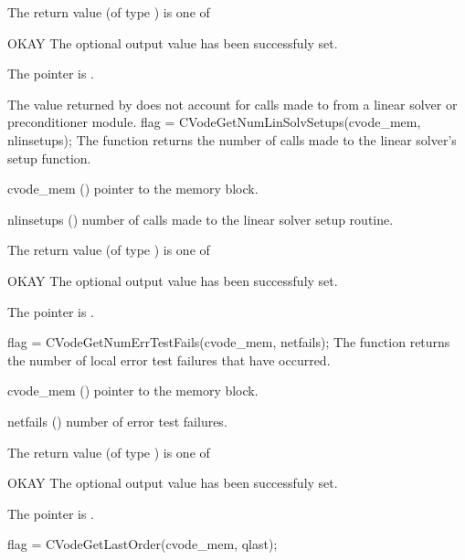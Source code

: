 {
  The return value  (of type ) is one of
  \begin{args}
  \item[OKAY] 
    The optional output value has been successfuly set.
  \item[\Id{CVG\_NO\_MEM}]
    The  pointer is .
  \end{args}
}
{
  The  value returned by  does not
  account for calls made to  from a linear solver or preconditioner 
  module. 
}
{
  flag = CVodeGetNumLinSolvSetups(cvode\_mem, nlinsetups);
}
{
  The function  returns the
  number of calls made to the linear solver's setup function.
}
{
  \begin{args}[nlinsetups]
  \item[cvode\_mem] ()
    pointer to the {\cvode} memory block.
  \item[nlinsetups] ()
    number of calls made to the linear solver setup routine.
  \end{args}
}
{
  The return value  (of type ) is one of
  \begin{args}
  \item[OKAY] 
    The optional output value has been successfuly set.
  \item[\Id{CVG\_NO\_MEM}]
    The  pointer is .
  \end{args}
}
{}
{
  flag = CVodeGetNumErrTestFails(cvode\_mem, netfails);
}
{
  The function  returns the
  number of local error test failures that have occurred.
}
{
  \begin{args}
  \item[cvode\_mem] ()
    pointer to the {\cvode} memory block.
  \item[netfails] ()
    number of error test failures.
  \end{args}
}
{
  The return value  (of type ) is one of
  \begin{args}
  \item[OKAY] 
    The optional output value has been successfuly set.
  \item[\Id{CVG\_NO\_MEM}]
    The  pointer is .
  \end{args}
}
{}
{
  flag = CVodeGetLastOrder(cvode\_mem, qlast);
}
